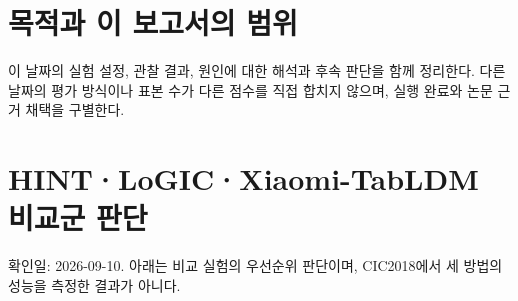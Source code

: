 




\section*{목적과 이 보고서의 범위}

이 날짜의 실험 설정, 관찰 결과, 원인에 대한 해석과 후속 판단을 함께 정리한다. 다른 날짜의 평가 방식이나 표본 수가 다른 점수를 직접 합치지 않으며, 실행 완료와 논문 근거 채택을 구별한다.


\section{HINT·LoGIC·Xiaomi-TabLDM 비교군 판단}
확인일: 2026-09-10. 아래는 비교 실험의 우선순위 판단이며, CIC2018에서 세 방법의 성능을 측정한 결과가 아니다.

